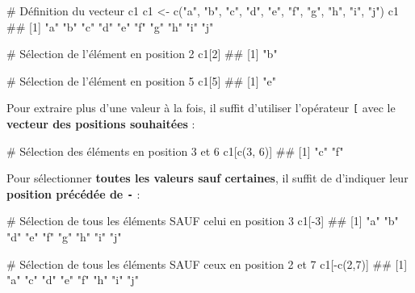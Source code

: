 \documentclass[12pt,twosided, notitlepage]{book}
\newenvironment{Shaded}{}{}
\newcommand{\KeywordTok}[1]{\textcolor[rgb]{0.00,0.00,1.00}{#1}}
\newcommand{\DecValTok}[1]{#1}
\newcommand{\StringTok}[1]{\textcolor[rgb]{0.00,0.50,0.50}{#1}}
\newcommand{\CommentTok}[1]{\textcolor[rgb]{0.00,0.50,0.00}{#1}}
\newcommand{\OperatorTok}[1]{#1}
\newcommand{\NormalTok}[1]{#1}
\renewenvironment{Shaded}{\begin{snugshade}}{\end{snugshade}}
\begin{document}
\begin{Shaded}
\begin{Highlighting}[]
\CommentTok{# Définition du vecteur c1}
\NormalTok{c1 <-}\StringTok{ }\KeywordTok{c}\NormalTok{(}\StringTok{"a"}\NormalTok{, }\StringTok{"b"}\NormalTok{, }\StringTok{"c"}\NormalTok{, }\StringTok{"d"}\NormalTok{, }\StringTok{"e"}\NormalTok{, }\StringTok{"f"}\NormalTok{, }\StringTok{"g"}\NormalTok{, }\StringTok{"h"}\NormalTok{, }\StringTok{"i"}\NormalTok{, }\StringTok{"j"}\NormalTok{)}
\NormalTok{c1}
\NormalTok{  ##  [1] "a" "b" "c" "d" "e" "f" "g" "h" "i" "j"}

\CommentTok{# Sélection de l'élément en position 2}
\NormalTok{c1[}\DecValTok{2}\NormalTok{]}
\NormalTok{  ## [1] "b"}

\CommentTok{# Sélection de l'élément en position 5}
\NormalTok{c1[}\DecValTok{5}\NormalTok{]}
\NormalTok{  ## [1] "e"}
\end{Highlighting}
\end{Shaded}

Pour extraire plus d'une valeur à la fois, il suffit d'utiliser
l'opérateur \texttt{{[}}\index{\texttt{[}|textbf} avec le
\textbf{vecteur des positions souhaitées} :

\begin{Shaded}
\begin{Highlighting}[]
\CommentTok{# Sélection des éléments en position 3 et 6}
\NormalTok{c1[}\KeywordTok{c}\NormalTok{(}\DecValTok{3}\NormalTok{, }\DecValTok{6}\NormalTok{)]}
\NormalTok{  ## [1] "c" "f"}
\end{Highlighting}
\end{Shaded}

Pour sélectionner \textbf{toutes les valeurs sauf certaines}, il suffit
de d'indiquer leur \textbf{position précédée de
\texttt{-}}\index{\texttt{-}} :

\begin{Shaded}
\begin{Highlighting}[]
\CommentTok{# Sélection de tous les éléments SAUF celui en position 3}
\NormalTok{c1[}\OperatorTok{-}\DecValTok{3}\NormalTok{]}
\NormalTok{  ## [1] "a" "b" "d" "e" "f" "g" "h" "i" "j"}

\CommentTok{# Sélection de tous les éléments SAUF ceux en position 2 et 7}
\NormalTok{c1[}\OperatorTok{-}\KeywordTok{c}\NormalTok{(}\DecValTok{2}\NormalTok{,}\DecValTok{7}\NormalTok{)]}
\NormalTok{  ## [1] "a" "c" "d" "e" "f" "h" "i" "j"}
\end{Highlighting}
\end{Shaded}
\end{document}
